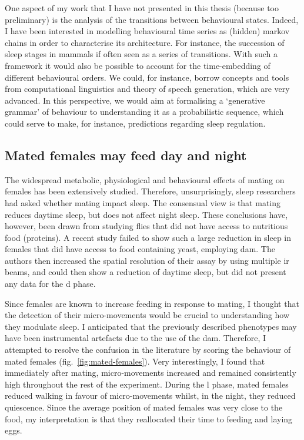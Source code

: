 One aspect of my work that I have not presented in this thesis (because too preliminary) is the analysis of the transitions between behavioural states. 
Indeed, I have been interested in modelling behavioural time series as (hidden) markov chains in order to characterise its architecture.
For instance, the succession of sleep stages in mammals if often seen as a series of transitions\cite{flexer_reliable_2005,perez-atencio_four-state_2018}. 
With such a framework it would also be possible to account for the time-embedding of different behavioural orders.
We could, for instance, borrow concepts and tools from computational linguistics and theory of speech generation, which are very advanced.
In this perspective, we would aim at formalising  a `generative grammar' of behaviour to understanding 
it as a probabilistic sequence, which could serve to make, for instance, predictions regarding sleep regulation.


\subsection{Mated females may feed day and night}

The widespread metabolic, physiological and behavioural effects of mating on females has been extensively studied\cite{gillott_male_2003,mcgraw_genes_2004,yapici_receptor_2008}.
Therefore, unsurprisingly, sleep researchers had asked whether mating impact sleep\cite{isaac_drosophila_2010,garbe_context-specific_2015,garbe_changes_2016,chen_genetic_2017}.
The consensual view is that mating reduces daytime sleep, but does not affect night sleep\cite{isaac_drosophila_2010,garbe_context-specific_2015,chen_genetic_2017}.
These conclusions have, however, been drawn from studying flies that did not have access to nutritious food (proteins).
A recent study failed to show such a large reduction in sleep in females that did have access to food containing yeast, employing \gls{dam}\cite{garbe_changes_2016}.
The authors then increased the spatial resolution of their assay by using multiple \gls{ir} beams, and could then show a reduction of daytime sleep, but did not present any data for the \gls{d} phase.

Since females are known to increase feeding in response to mating, I thought that the detection of their micro-movements would be crucial to understanding how they modulate sleep.
I anticipated that the previously described phenotypes may have been instrumental artefacts due to the use of the \gls{dam}.
Therefore, I attempted to resolve the confusion in the literature by scoring the behaviour of mated females (fig.~\ref{fig:mated-females}).
Very interestingly, I found that immediately after mating, micro-movements increased and remained consistently high throughout the rest of the experiment.
During the \gls{l} phase, mated females reduced walking in favour of micro-movements whilst, in the night, they reduced quiescence.
Since the average position of mated females was very close to the food, my interpretation is that they reallocated their time to feeding and laying eggs.

